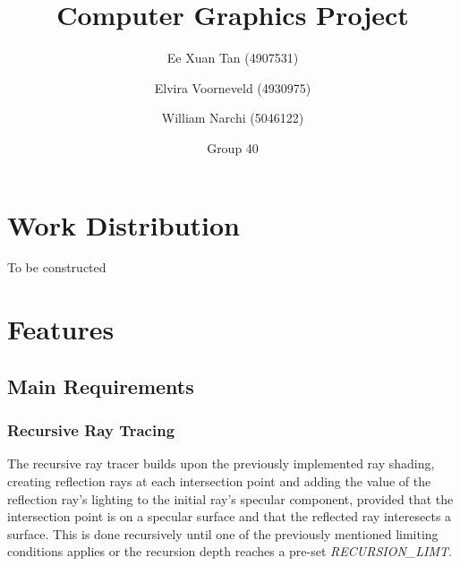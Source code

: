 \documentclass{article}
\author{Ee Xuan Tan (4907531) \and Elvira Voorneveld (4930975) \and William Narchi (5046122)}
\date{Group 40} %
\title{Computer Graphics Project}
\begin{document}
    \maketitle

    \section{Work Distribution}
    To be constructed

    \section{Features}
    \subsection{Main Requirements}
    \subsubsection{Recursive Ray Tracing}
    The recursive ray tracer builds upon the previously implemented ray shading,
    creating reflection rays at each intersection point and adding the value of the reflection ray's lighting to the initial ray's specular component,
    provided that the intersection point is on a specular surface and that the reflected ray interesects a surface.
    This is done recursively until one of the previously mentioned limiting conditions applies or the recursion depth reaches a pre-set \emph{RECURSION\_LIMT}.
\end{document}
